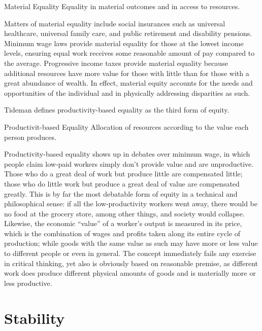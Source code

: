 \begin{definition}{Material Equality}
    Equality in material outcomes and in access to resources.
\end{definition}

Matters of material equality include social insurances such as universal healthcare, universal family care, and public retirement and disability pensions.  Minimum wage laws provide material equality for those at the lowest income levels, ensuring equal work receives some reasonable amount of pay compared to the average.  Progressive income taxes provide material equality because additional resources have more value for those with little than for those with a great abundance of wealth.  In effect, material equity accounts for the needs and opportunities of the individual and in physically addressing disparities as such.

Tideman defines productivity-based equality as the third form of equity.

\begin{definition}{Productivit-based Equality}
    Allocation of resources according to the value each person produces.
\end{definition}

Productivity-based equality shows up in debates over minimum wage, in which people claim low-paid workers simply don't provide value and are unproductive.  Those who do a great deal of work but produce little are compensated little; those who do little work but produce a great deal of value are compensated greatly.  This is by far the most debatable form of equity in a technical and philosophical sense:  if all the low-productivity workers went away, there would be no food at the grocery store, among other things, and society would collapse.  Likewise, the economic ``value'' of a worker's output is measured in its price, which is the combination of wages and profits taken along its entire cycle of production; while goods with the same value as such may have more or less value to different people or even in general.  The concept immediately fails any exercise in critical thinking, yet also is obviously based on reasonable premise, as different work does produce different physical amounts of goods and is materially more or less productive.

\section{Stability}

